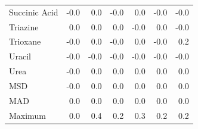 \begin{table}[h]
\begin{tabular}{lrrrrrr}
Succinic Acid & -0.0 & 0.0 & -0.0 & 0.0 & -0.0 & -0.0 \\
Triazine & 0.0 & 0.0 & 0.0 & -0.0 & 0.0 & -0.0 \\
Trioxane & -0.0 & 0.0 & -0.0 & 0.0 & -0.0 & 0.2 \\
Uracil & -0.0 & -0.0 & -0.0 & -0.0 & -0.0 & -0.0 \\
Urea & -0.0 & 0.0 & 0.0 & 0.0 & 0.0 & 0.0 \\
MSD & -0.0 & 0.0 & 0.0 & 0.0 & 0.0 & 0.0 \\
MAD & 0.0 & 0.0 & 0.0 & 0.0 & 0.0 & 0.0 \\
Maximum & 0.0 & 0.4 & 0.2 & 0.3 & 0.2 & 0.2 \\
\bottomrule
\end{tabular}

\end{table}
